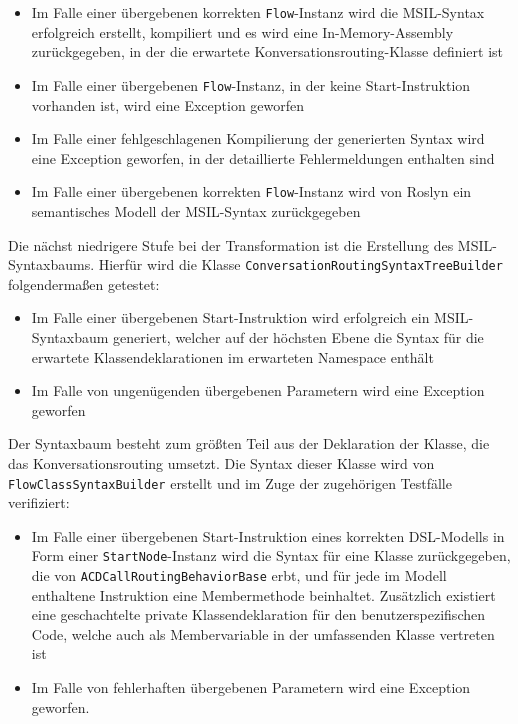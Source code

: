 \begin{itemize}
\item Im Falle einer übergebenen korrekten \texttt{Flow}-Instanz wird die MSIL-Syntax erfolgreich erstellt, kompiliert und es wird eine In-Memory-Assembly zurückgegeben, in der die erwartete Konversationsrouting-Klasse definiert ist
\item Im Falle einer übergebenen \texttt{Flow}-Instanz, in der keine Start-Instruktion vorhanden ist, wird eine Exception geworfen
\item Im Falle einer fehlgeschlagenen Kompilierung der generierten Syntax wird eine Exception geworfen, in der detaillierte Fehlermeldungen enthalten sind
\item Im Falle einer übergebenen korrekten \texttt{Flow}-Instanz wird von Roslyn ein semantisches Modell der MSIL-Syntax zurückgegeben
\end{itemize} 

Die nächst niedrigere Stufe bei der Transformation ist die Erstellung des MSIL-Syntaxbaums. Hierfür wird die Klasse \texttt{ConversationRoutingSyntaxTreeBuilder} folgendermaßen getestet:

\begin{itemize}
\item Im Falle einer übergebenen Start-Instruktion wird erfolgreich ein MSIL-Syntaxbaum generiert, welcher auf der höchsten Ebene die Syntax für die erwartete Klassendeklarationen im erwarteten Namespace enthält
\item Im Falle von ungenügenden übergebenen Parametern wird eine Exception geworfen
\end{itemize}

Der Syntaxbaum besteht zum größten Teil aus der Deklaration der Klasse, die das Konversationsrouting umsetzt. Die Syntax dieser Klasse wird von \texttt{FlowClassSyntaxBuilder} erstellt und im Zuge der zugehörigen Testfälle verifiziert:

\begin{itemize}
\item Im Falle einer übergebenen Start-Instruktion eines korrekten DSL-Modells in Form einer \texttt{StartNode}-Instanz wird die Syntax für eine Klasse zurückgegeben, die von \texttt{ACDCallRoutingBehaviorBase} erbt, und für jede im Modell enthaltene Instruktion eine Membermethode beinhaltet. Zusätzlich existiert eine geschachtelte private Klassendeklaration für den benutzerspezifischen Code, welche auch als Membervariable in der umfassenden Klasse vertreten ist
\item Im Falle von fehlerhaften übergebenen Parametern wird eine Exception geworfen.
\end{itemize}

